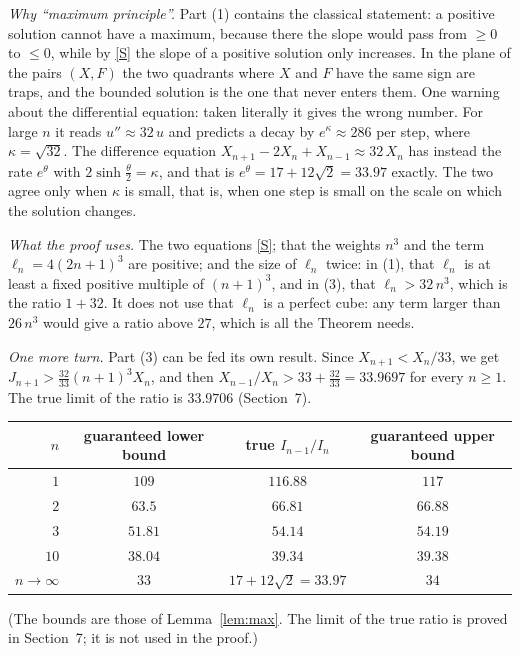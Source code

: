 \documentclass[11pt]{article}
\begin{document}
\noindent\emph{Why ``maximum principle''.} Part (1) contains the classical statement: a positive
solution cannot have a maximum, because there the slope would pass from $\ge0$ to $\le0$, while by
\eqref{S} the slope of a positive solution only increases. In the plane of the pairs $(X,F)$ the
two quadrants where $X$ and $F$ have the same sign are traps, and the bounded solution is the one
that never enters them. One warning about the differential equation: taken literally it gives the
wrong number. For large $n$ it reads $u''\approx32\,u$ and predicts a decay by
$e^{\kappa}\approx286$ per step, where $\kappa=\sqrt{32}$. The difference equation
$X_{n+1}-2X_n+X_{n-1}\approx32\,X_n$ has instead the rate $e^\theta$ with
$2\sinh\frac\theta2=\kappa$, and that is $e^\theta=17+12\sqrt2=33.97$ exactly. The two agree only
when $\kappa$ is small, that is, when one step is small on the scale on which the solution changes.

\noindent\emph{What the proof uses.} The two equations \eqref{S}; that the weights $n^3$ and the
term $\ell_n=4(2n+1)^3$ are positive; and the size of $\ell_n$ twice: in (1), that $\ell_n$ is at
least a fixed positive multiple of $(n+1)^3$, and in (3), that $\ell_n>32\,n^3$, which is the
ratio $1+32$. It does not use that $\ell_n$ is a perfect cube: any term larger than $26\,n^3$ would
give a ratio above $27$, which is all the Theorem needs.

\noindent\emph{One more turn.} Part (3) can be fed its own result. Since $X_{n+1}<X_n/33$, we get
$J_{n+1}>\frac{32}{33}(n+1)^3X_n$, and then $X_{n-1}/X_n>33+\frac{32}{33}=33.9697$ for every
$n\ge1$. The true limit of the ratio is $33.9706$ (Section~7).

\begin{center}
\begin{tabular}{@{}rccc@{}}
\toprule
$n$ & guaranteed lower bound & true $I_{n-1}/I_n$ & guaranteed upper bound\\
\midrule
$1$ & $109$ & $116.88$ & $117$\\
$2$ & $63.5$ & $66.81$ & $66.88$\\
$3$ & $51.81$ & $54.14$ & $54.19$\\
$10$ & $38.04$ & $39.34$ & $39.38$\\
$n\to\infty$ & $33$ & $17+12\sqrt2=33.97$ & $34$\\
\bottomrule
\end{tabular}
\end{center}
(The bounds are those of Lemma~\ref{lem:max}. The limit of the true ratio is proved in Section~7; it
is not used in the proof.)
\end{document}
